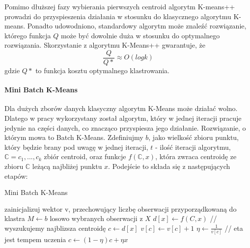 \documentclass{article}
\begin{document}
Pomimo dłuższej fazy wybierania pierwszych centroid algorytm K-means++ prowadzi do przyspieszenia działania w stosunku do klasycznego algorytmu K-means. Ponadto udowodniono, standardowy algorytm może znaleźć rozwiązanie, którego funkcja \(Q\) może być dowolnie duża w stosunku do optymalnego rozwiązania.
Skorzystanie z algorytmu K-Means++ gwarantuje, że 
\[\frac{Q}{Q*} \approx O(log k)\]
gdzie \(Q*\) to funkcja kosztu optymalnego klastrowania. %

\paragraph{Mini Batch K-Means}
Dla dużych zborów danych klasyczny algorytm K-Means może działać wolno. Dlatego w pracy wykorzystany został algorytm, który w jednej iteracji pracuje jedynie na części danych, co znacząco przyspiesza jego działanie\citep{Sculley2010}.
Rozwiązanie, o którym mowa to Batch K-Means.
Zdefiniujmy \(b\), jako wielkość zbioru punktu, który będzie brany pod uwagę w jednej iteracji, \(t\) - ilość iteracji algorytmu, \(\mathbb{C} = {c_1, ..., c_k}\) zbiór centroid, oraz funkcje \(f(\mathbb{C}, x)\), która zwraca centroidę ze zbioru \(\mathbb{C}\) leżącą najbliżej punktu \(x\).
Podejście to składa się z następujących etapów:

\begin{algorithm}
\label{batch_k_means}
\caption{Mini Batch K-Means}
\begin{algorithmic}[1]
\STATE zainicjalizuj wektor v, przechowujący liczbę obserwacji przyporządkowaną do 
klastra
	\STATE $M \leftarrow b$ losowo wybranych obserwacji z $X$
		\STATE $d[x] \leftarrow f(C,x)$ // wyszukujemy najblizsza centroidę
	\ENDFOR
		\STATE $c \leftarrow d[x]$
		\STATE $v[c] \leftarrow v[c] + 1$
		\STATE $\eta \leftarrow \frac{1}{v[c]}$ // eta jest tempem uczenia
		\STATE $c \leftarrow (1 - \eta)c + \eta x$ 
	\ENDFOR
\ENDFOR
\end{algorithmic}
\end{algorithm}
\end{document}
